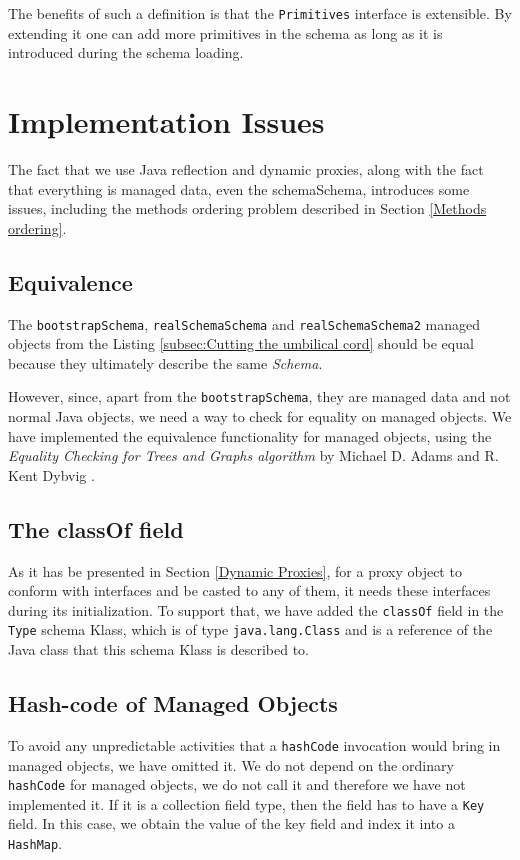 The benefits of such a definition is that the \texttt{Primitives} interface is extensible.
By extending it one can add more primitives in the schema as long as it is introduced during the schema loading.

\section{Implementation Issues}\label{Implementation Issues}
The fact that we use Java reflection and dynamic proxies, along with the fact that everything is managed data, even the schemaSchema, introduces some issues, including the methods ordering problem described in Section \ref{Methods ordering}.

\subsection{Equivalence}\label{Managed Object equivalence}
The \texttt{bootstrapSchema}, \texttt{realSchemaSchema} and \texttt{realSchemaSchema2} managed objects from the Listing \ref{subsec:Cutting the umbilical cord} should be equal because they ultimately describe the same \textit{Schema}.

However, since, apart from the \texttt{bootstrapSchema}, they are managed data and not normal Java objects, we need a way to check for equality on managed objects.
We have implemented the equivalence functionality for managed objects, using the \textit{Equality Checking for Trees and Graphs
algorithm} by Michael D. Adams and R. Kent Dybvig \cite{adams2008efficient}.

\subsection{The classOf field}\label{The classOf field}
As it has be presented in Section \ref{Dynamic Proxies}, for a proxy object to conform with interfaces and be casted to any of them, it needs these interfaces during its initialization.
To support that, we have added the \texttt{classOf} field in the \texttt{Type} schema Klass, which is of type \texttt{java.lang.Class} and is a reference of the Java class that this schema Klass is described to.

\subsection{Hash-code of Managed Objects}\label{Hashcode of Managed Objects}
To avoid any unpredictable activities that a \texttt{hashCode} invocation would bring in managed objects, we have omitted it. 
We do not depend on the ordinary \texttt{hashCode} for managed objects, we do not call it and therefore we have not implemented it.
If it is a collection field type, then the field has to have a \texttt{Key} field. 
In this case, we obtain the value of the key field and index it into a \texttt{HashMap}. 

